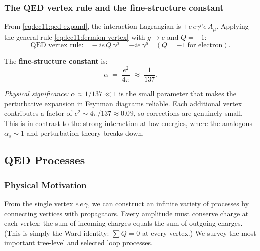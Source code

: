 \documentclass[../main.tex]{subfiles}
\begin{document}
\subsubsection*{The QED vertex rule and the fine-structure constant}

From \eqref{eq:lec11:qed-expand}, the interaction Lagrangian is $+e\,\bar{e}\gamma^\mu e\,A_\mu$.  Applying the general rule \eqref{eq:lec11:fermion-vertex} with $g\to e$ and $Q=-1$:
\begin{equation}
  \boxed{
  \text{QED vertex rule:}\quad
  -ie\,Q\,\gamma^\mu = +ie\,\gamma^\mu
  \quad(Q=-1\;\text{for electron}).}
  \label{eq:lec11:qed-vertex}
\end{equation}

The \textbf{fine-structure constant} is:
\begin{equation}
  \boxed{
  \alpha \;=\; \frac{e^2}{4\pi} \;\approx\; \frac{1}{137}.}
  \label{eq:lec11:alpha}
\end{equation}

\textit{Physical significance:} $\alpha\approx 1/137\ll 1$ is the small parameter that makes the perturbative expansion in Feynman diagrams reliable.  Each additional vertex contributes a factor of $e^2\sim 4\pi/137\approx 0.09$, so corrections are genuinely small.  This is in contrast to the strong interaction at low energies, where the analogous $\alpha_s\sim 1$ and perturbation theory breaks down.

\subsection*{QED Processes}\label{sec:lec11:qed-processes}

\subsubsection*{Physical Motivation}

From the single vertex $\bar{e}\,e\,\gamma$, we can construct an infinite variety of processes by connecting vertices with propagators.  Every amplitude must conserve charge at each vertex: the sum of incoming charges equals the sum of outgoing charges.  (This is simply the Ward identity: $\sum Q = 0$ at every vertex.)  We survey the most important tree-level and selected loop processes.

\end{document}
